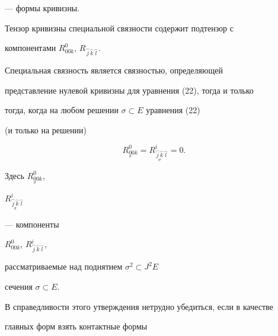 --- формы кривизны.





\begin{lems}


Тензор кривизны специальной связности содержит подтензор с


компонентами $R_{00k}^0$, $R_{\overset{\frown}{j}{}


\overset{\frown}{k}{}


\overset{\frown}{l}{}}$.


\end{lems}





\begin{notes}


Специальная связность является связностью, определяющей


представление нулевой кривизны для уравнения {(22)}, тогда и только 


тогда, когда на любом решении $\sigma \subset E$ уравнения {(22)}


(и только на решении)


$$


R_{\underset{\sigma}{0}{}0k}^0=


R_{\underset{\sigma}{\overset{\frown}{j}{}\overset{\frown}{k}{}}{}


\overset{\frown}{l}{}}^i=0.


$$


Здесь $R_{\underset{\sigma}{0}{}0k}^0$,


$R_{\underset{\sigma}{\overset{\frown}{j}{}\overset{\frown}{k}{}}{}


\overset{\frown}{l}{}}^i$


--- компоненты


$R_{00k}^0$, $R_{\overset{\frown}{j}{}


\overset{\frown}{k}{}


\overset{\frown}{l}{}}^i$,


рассматриваемые над поднятием $\sigma^2 \subset J^2 E$ 


сечения $\sigma \subset E$.


\end{notes}





В справедливости этого утверждения нетрудно убедиться, если в качестве 


главных форм взять контактные формы


